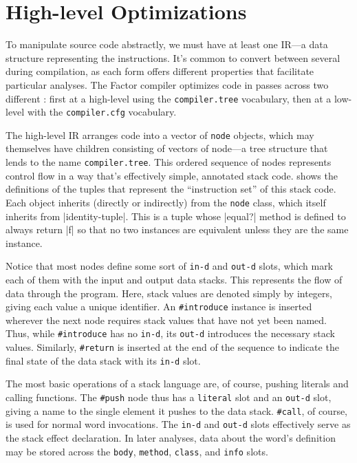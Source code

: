\section{High-level Optimizations}\label{sec:compiler:tree}

To manipulate source code abstractly, we must have at least one \gls{IR}---a
data structure representing the instructions.  It's common to convert between
several  during compilation, as each form offers different
properties that facilitate particular analyses.  The Factor compiler optimizes
code in passes across two different : first at a high-level using
the \Verb|compiler.tree| vocabulary, then at a low-level with the
\Verb|compiler.cfg| vocabulary.


\begin{sloppypar}
The high-level \gls{IR} arranges code into a vector of \Verb|node| objects,
which may themselves have children consisting of vectors of node---a tree
structure that lends to the name \Verb|compiler.tree|.  This ordered sequence
of nodes represents control flow in a way that's effectively simple, annotated
stack code.   shows the definitions of the tuples that represent
the ``instruction set'' of this stack code.  Each object inherits (directly or
indirectly) from the \Verb|node| class, which itself inherits from
\factor|identity-tuple|.  This is a tuple whose \factor|equal?| method is
defined to always return \factor|f| so that no two instances are equivalent
unless they are the same instance.
\end{sloppypar}

Notice that most nodes define some sort of \Verb|in-d| and \Verb|out-d|
slots, which mark each of them with the input and output data stacks.  This
represents the flow of data through the program.  Here, stack values are
denoted simply by integers, giving each value a unique identifier.  An
\Verb|#introduce| instance is inserted wherever the next node requires stack
values that have not yet been named.  Thus, while \Verb|#introduce| has no
\Verb|in-d|, its \Verb|out-d| introduces the necessary stack values.
Similarly, \Verb|#return| is inserted at the end of the sequence to indicate
the final state of the data stack with its \Verb|in-d| slot.

The most basic operations of a stack language are, of course, pushing literals
and calling functions.  The \Verb|#push| node thus has a \Verb|literal|
slot and an \Verb|out-d| slot, giving a name to the single element it pushes
to the data stack.  \Verb|#call|, of course, is used for normal word
invocations.  The \Verb|in-d| and \Verb|out-d| slots effectively serve as
the stack effect declaration.  In later analyses, data about the word's
definition may be stored across the \Verb|body|, \Verb|method|,
\Verb|class|, and \Verb|info| slots.

